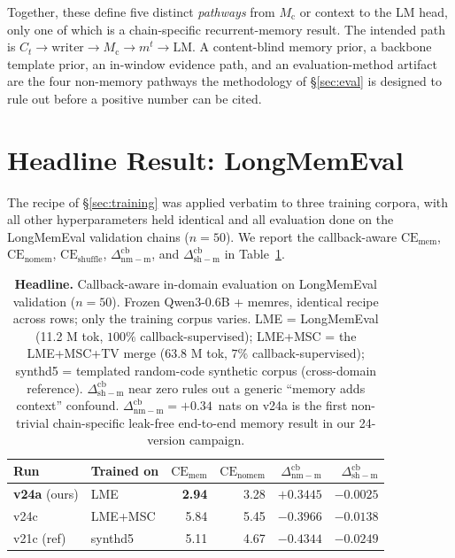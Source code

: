 \documentclass[11pt]{article}
\newcommand{\Mc}{M_{\mathrm{c}}}
\newcommand{\Ct}{C_t}
\newcommand{\mt}{m^t}
\newcommand{\dnm}{\Delta_{\mathrm{nm{-}m}}}
\newcommand{\dsh}{\Delta_{\mathrm{sh{-}m}}}
\newcommand{\CEmem}{\mathrm{CE}_{\mathrm{mem}}}
\newcommand{\CEnomem}{\mathrm{CE}_{\mathrm{nomem}}}
\newcommand{\CEsh}{\mathrm{CE}_{\mathrm{shuffle}}}
\begin{document}
Together, these define five distinct \emph{pathways} from
$\Mc$ or context to the LM head, only one of which is a chain-specific
recurrent-memory result. The intended path is
$\Ct \to \mathrm{writer} \to \Mc \to \mt \to \mathrm{LM}$. A
content-blind memory prior, a backbone template prior, an in-window
evidence path, and an evaluation-method artifact are the four
non-memory pathways the methodology of \S\ref{sec:eval} is designed
to rule out before a positive number can be cited.

\section{Headline Result: LongMemEval}
\label{sec:results}

The recipe of \S\ref{sec:training} was applied verbatim to three
training corpora, with all other hyperparameters held identical and
all evaluation done on the LongMemEval validation chains
($n{=}50$).
We report the callback-aware $\CEmem$, $\CEnomem$, $\CEsh$,
$\dnm^{\mathrm{cb}}$, and $\dsh^{\mathrm{cb}}$ in
Table~\ref{tab:headline}.

\begin{table}[t]
\centering
\small
\caption{\textbf{Headline.} Callback-aware in-domain evaluation on
LongMemEval validation ($n{=}50$). Frozen Qwen3-0.6B + memres,
identical recipe across rows; only the training corpus varies.
LME = LongMemEval (11.2 M tok, $100\%$ callback-supervised);
LME+MSC = the LME+MSC+TV merge (63.8 M tok, $7\%$ callback-supervised);
synthd5 = templated random-code synthetic corpus (cross-domain
reference). $\dsh^{\mathrm{cb}}$ near zero rules out a generic
``memory adds context'' confound. $\dnm^{\mathrm{cb}} = +0.34$~nats
on v24a is the first non-trivial chain-specific leak-free end-to-end
memory result in our 24-version campaign.}
\label{tab:headline}
\begin{tabular}{llrrrr}
\toprule
Run & Trained on & $\CEmem$ & $\CEnomem$ & $\dnm^{\mathrm{cb}}$ & $\dsh^{\mathrm{cb}}$ \\
\midrule
\textbf{v24a} (ours) & LME      & \textbf{2.94} & 3.28 & $\mathbf{+0.3445}$ & $-0.0025$ \\
v24c                 & LME+MSC  & 5.84          & 5.45 & $-0.3966$          & $-0.0138$ \\
v21c (ref)           & synthd5  & 5.11          & 4.67 & $-0.4344$          & $-0.0249$ \\
\bottomrule
\end{tabular}
\end{table}
\end{document}
